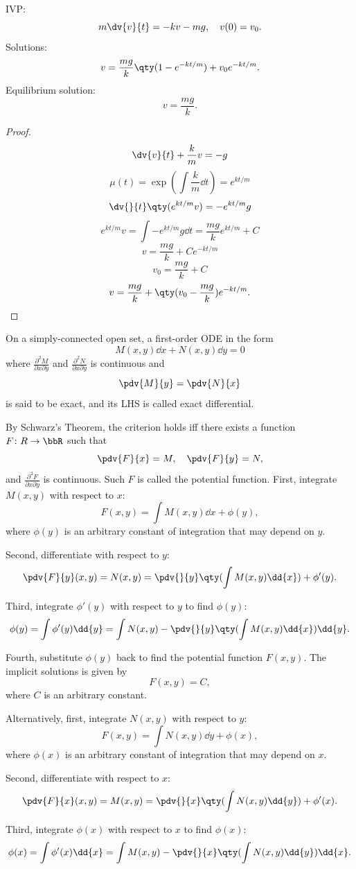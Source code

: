 \documentclass[a4paper,12pt]{report}
\begin{document}
IVP:
\[m\dv{v}{t}=-kv-mg,\quad v(0)=v_0.\]
Solutions:
\[v=\frac{mg}{k}\qty(1-e^{-kt/m})+v_0e^{-kt/m}.\]
Equilibrium solution:
\[v=\frac{mg}{k}.\]
\begin{proof}
\[\dv{v}{t}+\frac{k}{m}v=-g\]
\[\mu(t)=\exp(\int\frac{k}{m}\dd{t})=e^{kt/m}\]
\[\dv{}{t}\qty(e^{kt/m}v)=-e^{kt/m}g\]
\[e^{kt/m}v=\int-e^{kt/m}g\dd{t}=\frac{mg}{k}e^{kt/m}+C\]
\[v=\frac{mg}{k}+Ce^{-kt/m}\]
\[v_0=\frac{mg}{k}+C\]
\[v=\frac{mg}{k}+\qty(v_0-\frac{mg}{k})e^{-kt/m}.\]
\end{proof}
On a simply-connected open set, a first-order ODE in the form
\[M(x,y)\dd{x}+N(x,y)\dd{y}=0\]
where $\frac{\partial^2M}{\partial x\partial y}$ and $\frac{\partial^2N}{\partial x\partial y}$ is continuous and
\[\pdv{M}{y}=\pdv{N}{x}\]
is said to be exact, and its LHS is called exact differential.

By Schwarz's Theorem, the criterion holds iff there exists a function $F\colon R\to\bbR$ such that
\[\pdv{F}{x}=M,\quad\pdv{F}{y}=N,\]
and $\frac{\partial^2F}{\partial x\partial y}$ is continuous. Such $F$ is called the potential function.
First, integrate $M(x,y)$ with respect to $x$:
\[F(x,y)=\int M(x,y)\dd{x}+\phi(y),\]
where $\phi(y)$ is an arbitrary constant of integration that may depend on $y$.

Second, differentiate with respect to $y$:
\[\pdv{F}{y}(x,y)=N(x,y)=\pdv{}{y}\qty(\int M(x,y)\dd{x})+\phi'(y).\]

Third, integrate $\phi'(y)$ with respect to $y$ to find $\phi(y)$:
\[\phi(y)=\int\phi'(y)\dd{y}=\int N(x,y)-\pdv{}{y}\qty(\int M(x,y)\dd{x})\dd{y}.\]

Fourth, substitute $\phi(y)$ back to find the potential function $F(x,y)$. The implicit solutions is given by
\[F(x,y)=C,\]
where $C$ is an arbitrary constant.

Alternatively, first, integrate $N(x,y)$ with respect to $y$:
\[F(x,y)=\int N(x,y)\dd{y}+\phi(x),\]
where $\phi(x)$ is an arbitrary constant of integration that may depend on $x$.

Second, differentiate with respect to $x$:
\[\pdv{F}{x}(x,y)=M(x,y)=\pdv{}{x}\qty(\int N(x,y)\dd{y})+\phi'(x).\]

Third, integrate $\phi(x)$ with respect to $x$ to find $\phi(x)$:
\[\phi(x)=\int\phi'(x)\dd{x}=\int M(x,y)-\pdv{}{x}\qty(\int N(x,y)\dd{y})\dd{x}.\]
\end{document}
